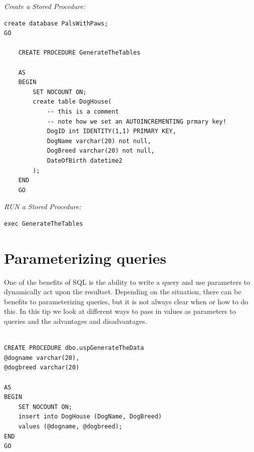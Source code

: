\emph{Create a Stored Procedure:}
\begin{Verbatim}[frame=single]
create database PalsWithPaws;
GO

    CREATE PROCEDURE GenerateTheTables
    
    AS
    BEGIN
    	SET NOCOUNT ON;
    	create table DogHouse(
    		-- this is a comment
    		-- note how we set an AUTOINCREMENTING prmary key!
    		DogID int IDENTITY(1,1) PRIMARY KEY,
    		DogName varchar(20) not null,
    		DogBreed varchar(20) not null,
    		DateOfBirth datetime2 
    	);
    END
    GO
\end{Verbatim}

\emph{RUN a Stored Procedure:}
\begin{Verbatim}[frame=single]
exec GenerateTheTables
\end{Verbatim}

\section * {Parameterizing queries}
One of the benefits of SQL is the ability to write a query and use parameters to dynamically act upon the resultset. Depending on the situation, there can be benefits to parameterizing queries, but it is not always clear when or how to do this.  In this tip we look at different ways to pass in values as parameters to queries and the advantages and disadvantages.

\begin{Verbatim}[frame=single]

CREATE PROCEDURE dbo.uspGenerateTheData
@dogname varchar(20),
@dogbreed varchar(20)

AS
BEGIN
	SET NOCOUNT ON;
	insert into DogHouse (DogName, DogBreed) 
	values (@dogname, @dogbreed);
END
GO

\end{Verbatim}


